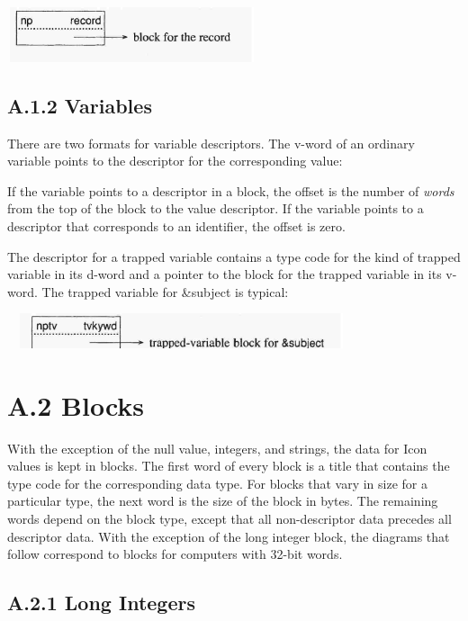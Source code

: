 \includegraphics[width=2.8846in,height=0.6335in]{ib-img/ib-img112.jpg} 

\subsection[A.1.2 Variables]{A.1.2 Variables}

There are two formats for variable descriptors. The v-word of an
ordinary variable points to the descriptor for the corresponding
value:


\bigskip


If the variable points to a descriptor in a block, the offset is the
number of \textit{words} from the top of the block to the value
descriptor. If the variable points to a descriptor that corresponds to
an identifier, the offset is zero.


The descriptor for a trapped variable contains a type code for the
kind of trapped variable in its d-word and a pointer to the block for
the trapped variable in its v-word. The trapped variable for \&subject
is typical:


\ \  \includegraphics[width=3.7402in,height=0.4008in]{ib-img/ib-img113.jpg} 

\section[A.2 Blocks]{A.2 Blocks}

With the exception of the null value, integers, and strings, the data
for Icon values is kept in blocks. The first word of every block is a
title that contains the type code for the corresponding data type. For
blocks that vary in size for a particular type, the next word is the
size of the block in bytes. The remaining words depend on the block
type, except that all non-descriptor data precedes all descriptor
data. With the exception of the long integer block, the diagrams that
follow correspond to blocks for computers with 32-bit words.

\subsection[A.2.1 Long Integers]{A.2.1 Long Integers}

